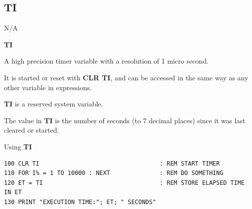 \newpage
\subsection{TI}
\begin{description}[leftmargin=2cm,style=nextline]
\item [Token:]    N/A

\item [Format:]   {\bf TI}

\item [Usage:]    A high precision timer variable with a resolution of 1 micro second.

                  It is started or reset with {\bf CLR TI}, and can be accessed in the same way as any other variable in expressions.

\item [Remarks:]  {\bf TI} is a reserved system variable.

                  The value in {\bf TI} is the number of seconds (to 7 decimal places) since it was last cleared or started.

\item [Example:]  Using {\bf TI}

\begin{tcolorbox}[colback=black,coltext=white]
\verbatimfont{\codefont}
\begin{verbatim}
100 CLR TI                                  : REM START TIMER
110 FOR I% = 1 TO 10000 : NEXT              : REM DO SOMETHING
120 ET = TI                                 : REM STORE ELAPSED TIME IN ET
130 PRINT "EXECUTION TIME:"; ET; " SECONDS"
\end{verbatim}
\end{tcolorbox}
\end{description}


\newpage
